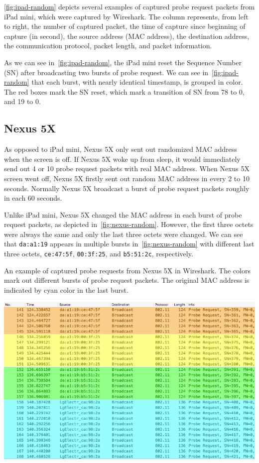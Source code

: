 	\autoref{fig:ipad-random} depicts several examples of captured probe request packets from iPad mini, which were captured by Wireshark. The column represents, from left to right, the number of captured packet, the time of capture since beginning of capture (in second), the source address (\ac{MAC} address), the destination address, the communication protocol, packet length, and packet information.
	
	As we can see in~\autoref{fig:ipad-random}, the iPad mini reset the Sequence Number (\ac{SN}) after broadcasting two bursts of probe request. We can see in~\autoref{fig:ipad-random} that each burst, with nearly identical timestamp, is grouped in color. The red boxes mark the \ac{SN} reset, which mark a transition of \ac{SN} from 78 to 0, and 19 to 0.


	\subsection{Nexus 5X} %
	\label{sub:lg_nexus_5x}
	As opposed to iPad mini, Nexus 5X only sent out randomized \ac{MAC} address when the screen is off. If Nexus 5X woke up from sleep, it would immediately send out 4 or 10 probe request packets with real \ac{MAC} address. When Nexus 5X screen went off, Nexus 5X firstly sent out random \ac{MAC} address in every 2 to 10 seconds. Normally Nexus 5X broadcast a burst of probe request packets roughly in each 60 seconds.

	Unlike iPad mini, Nexus 5X changed the \ac{MAC} address in each burst of probe request packets, as depicted in~\autoref{fig:nexus-random}. However, the first three octets were always the same and only the last three octets were changed. We can see that \verb|da:a1:19| appears in multiple bursts in~\autoref{fig:nexus-random} with different last three octets, \verb|ce:47:5f|, \verb|00:3f:25|, and \verb|b5:51:2c|, respectively.
	
	\begin{table}[h]
		\centering
		\caption[An example of captured probe requests from Nexus 5X.]{An example of captured probe requests from Nexus 5X in Wireshark. The colors mark out different bursts of probe request packets. The original \ac{MAC} address is indicated by cyan color in the last burst.}
		\label{fig:nexus-random}
		\includegraphics[width=\textwidth]{./img/result/randomization/nexus-5x}
	\end{table}	

